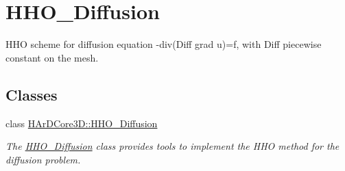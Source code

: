 \hypertarget{group__HHO__Diffusion}{}\section{H\+H\+O\+\_\+\+Diffusion}
\label{group__HHO__Diffusion}


H\+HO scheme for diffusion equation -\/div(Diff grad u)=f, with Diff piecewise constant on the mesh.  


\subsection*{Classes}
\begin{DoxyCompactItemize}
\item 
class \hyperlink{classHArDCore3D_1_1HHO__Diffusion}{H\+Ar\+D\+Core3\+D\+::\+H\+H\+O\+\_\+\+Diffusion}
\begin{DoxyCompactList}\small\item\em The \hyperlink{classHArDCore3D_1_1HHO__Diffusion}{H\+H\+O\+\_\+\+Diffusion} class provides tools to implement the H\+HO method for the diffusion problem. \end{DoxyCompactList}\end{DoxyCompactItemize}
